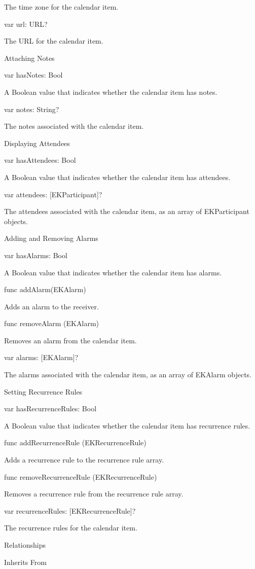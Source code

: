 \documentclass{article}
\begin{document}
The time zone for the calendar item.

var url: URL?

The URL for the calendar item.

Attaching Notes

var hasNotes: Bool

A Boolean value that indicates whether the calendar item has notes.

var notes: String?

The notes associated with the calendar item.

Displaying Attendees

var hasAttendees: Bool

A Boolean value that indicates whether the calendar item has attendees.

var attendees: [EKParticipant]?

The attendees associated with the calendar item, as an array of EKParticipant objects.

Adding and Removing Alarms

var hasAlarms: Bool

A Boolean value that indicates whether the calendar item has alarms.

func addAlarm(EKAlarm)

Adds an alarm to the receiver.

func removeAlarm (EKAlarm)

Removes an alarm from the calendar item.

var alarms: [EKAlarm]?

The alarms associated with the calendar item, as an array of EKAlarm objects.

Setting Recurrence Rules

var hasRecurrenceRules: Bool

A Boolean value that indicates whether the calendar item has recurrence rules.

func addRecurrenceRule (EKRecurrenceRule)

Adds a recurrence rule to the recurrence rule array.

func removeRecurrenceRule (EKRecurrenceRule)

Removes a recurrence rule from the recurrence rule array.

var recurrenceRules: [EKRecurrenceRule]?

The recurrence rules for the calendar item.

Relationships

Inherits From
\end{document}
